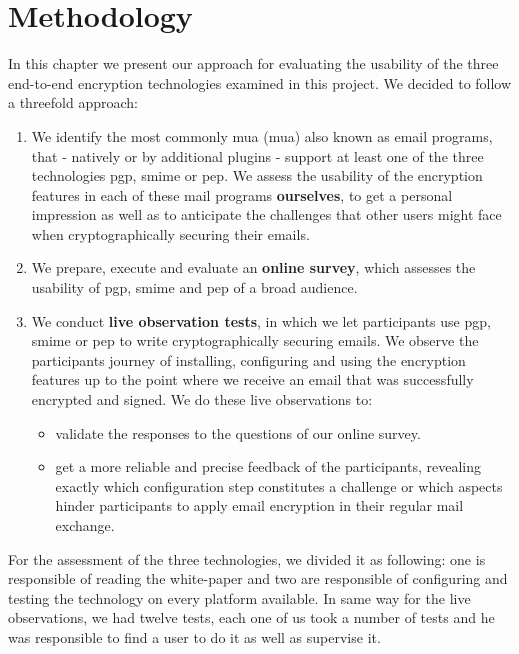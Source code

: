 \section{Methodology}
In this chapter we present our approach for evaluating the usability of the three end-to-end encryption technologies examined in this project. We decided to follow a threefold approach:
\begin{enumerate}
	\item We identify the most commonly \acrlong{mua} (\acrshort{mua}) also known as email programs, that - natively or by additional plugins -  support at least one of the three technologies \acrshort{pgp}, \acrshort{smime} or \acrshort{pep}. We assess the usability of the encryption features in each of these mail programs \textbf{ourselves}, to get a personal impression as well as to anticipate the challenges that other users might face when cryptographically securing their emails.
	\item We prepare, execute and evaluate an \textbf{online survey}, which assesses the usability of \acrshort{pgp}, \acrshort{smime} and \acrshort{pep} of a broad audience.
	\item We conduct \textbf{live observation tests}, in which we let participants use \acrshort{pgp}, \acrshort{smime} or \acrshort{pep} to write cryptographically securing emails. We observe the participants journey of installing, configuring and using the encryption features up to the point where we receive an email that was successfully encrypted and signed. We do these live observations to:
	\begin{itemize}
		\item validate the responses to the questions of our online survey.
		\item get a more reliable and precise feedback of the participants, revealing exactly which configuration step constitutes a challenge or which aspects hinder participants to apply email encryption in their regular mail exchange.
	\end{itemize}
\end{enumerate}
For the assessment of the three technologies, we divided it as following: one is responsible of reading the white-paper and two are responsible of configuring and testing the technology on every platform available. In same way for the live observations, we had twelve tests, each one of us took a number of tests and he was responsible to find a user to do it as well as supervise it.